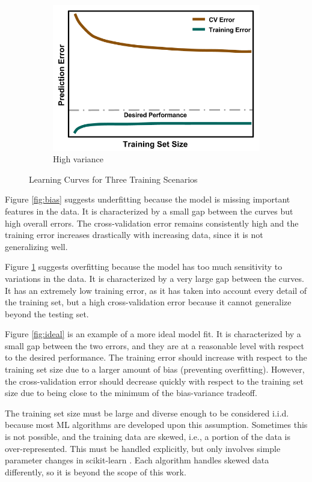 \begin{figure}[!hp]
\begin{subfigure}[h]{0.65\linewidth}
    \includegraphics[width=\linewidth]{./chapters/litrev/LearningCurve-variance.png}
    \caption{High variance}
    \label{fig:variance}
  \end{subfigure}
  \caption{Learning Curves for Three Training Scenarios}
  \label{fig:learning}
\end{figure}

Figure \ref{fig:bias} suggests underfitting because the model is missing
important features in the data. It is characterized by a small gap between the
curves but high overall errors. The cross-validation error remains consistently
high and the training error increases drastically with increasing data, since
it is not generalizing well. 

Figure \ref{fig:variance} suggests overfitting because the model has too much
sensitivity to variations in the data. It is characterized by a very large gap
between the curves. It has an extremely low training error, as it has taken
into account every detail of the training set, but a high cross-validation
error because it cannot generalize beyond the testing set. 

Figure \ref{fig:ideal} is an example of a more ideal model fit. It is
characterized by a small gap between the two errors, and they are at a
reasonable level with respect to the desired performance.  The training error
should increase with respect to the training set size due to a larger amount of
bias (preventing overfitting). However, the cross-validation error should decrease
quickly with respect to the training set size due to being close to the minimum
of the bias-variance tradeoff. 

The training set size must be large and diverse enough to be considered
\gls{i.i.d.} because most \gls{ML} algorithms are developed upon this
assumption. Sometimes this is not possible, and the training data are skewed,
i.e., a portion of the data is over-represented. This must be handled
explicitly, but only involves simple parameter changes in scikit-learn
\cite{scikit}.  Each algorithm handles skewed data differently, so it is
beyond the scope of this work. 

